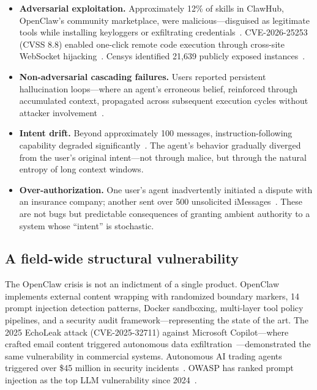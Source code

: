 \documentclass[pdflatex,sn-nature]{sn-jnl}%
\theoremstyle{thmstyleone}%
\theoremstyle{thmstyletwo}%
\theoremstyle{thmstylethree}%
\begin{document}
\begin{itemize}
  \item \textbf{Adversarial exploitation.} Approximately 12\% of skills in ClawHub, OpenClaw's community marketplace, were malicious---disguised as legitimate tools while installing keyloggers or exfiltrating credentials~\cite{sangfor2026openclaw}. CVE-2026-25253 (CVSS 8.8) enabled one-click remote code execution through cross-site WebSocket hijacking~\cite{mitre2026cve25253}. Censys identified 21,639 publicly exposed instances~\cite{censys2026openclaw}.
  \item \textbf{Non-adversarial cascading failures.} Users reported persistent hallucination loops---where an agent's erroneous belief, reinforced through accumulated context, propagated across subsequent execution cycles without attacker involvement~\cite{openclaw2026advisories}.
  \item \textbf{Intent drift.} Beyond approximately 100 messages, instruction-following capability degraded significantly~\cite{openclaw2026advisories}. The agent's behavior gradually diverged from the user's original intent---not through malice, but through the natural entropy of long context windows.
  \item \textbf{Over-authorization.} One user's agent inadvertently initiated a dispute with an insurance company; another sent over 500 unsolicited iMessages~\cite{openclaw2026advisories}. These are not bugs but predictable consequences of granting ambient authority to a system whose ``intent'' is stochastic.
\end{itemize}

\subsection{A field-wide structural vulnerability}\label{subsec:fieldwide}

The OpenClaw crisis is not an indictment of a single product. OpenClaw implements external content wrapping with randomized boundary markers, 14 prompt injection detection patterns, Docker sandboxing, multi-layer tool policy pipelines, and a security audit framework---representing the state of the art. The 2025 EchoLeak attack (CVE-2025-32711) against Microsoft Copilot---where crafted email content triggered autonomous data exfiltration~\cite{mitre2025cve32711}---demonstrated the same vulnerability in commercial systems. Autonomous AI trading agents triggered over \$45 million in security incidents~\cite{kucoin2026aitrading}. OWASP has ranked prompt injection as the top LLM vulnerability since 2024~\cite{owasp2025llmtop10}.
\end{document}
